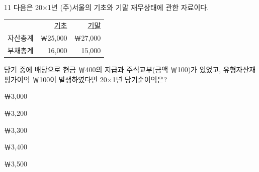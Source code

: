 \begin{question}{11}
다음은 20×1년 (주)서울의 기초와 기말 재무상태에 관한 자료이다.
\begin{center}
\small
\begin{tabular}{|l r r|}
\hline
 & \uline{기초} & \uline{기말} \\
자산총계 & ￦25,000 & ￦27,000 \\
부채총계 & 16,000 & 15,000 \\
\hline
\end{tabular}
\end{center}
당기 중에 배당으로 현금 ￦400의 지급과 주식교부(금액 ￦100)가 있었고, 유형자산재평가이익 ￦100이 발생하였다면 20×1년 당기순이익은? \par
\begin{choices}
  \item ￦3,000
  \item ￦3,200
  \item ￦3,300
  \item ￦3,400
  \item ￦3,500
\end{choices}
\end{question}
